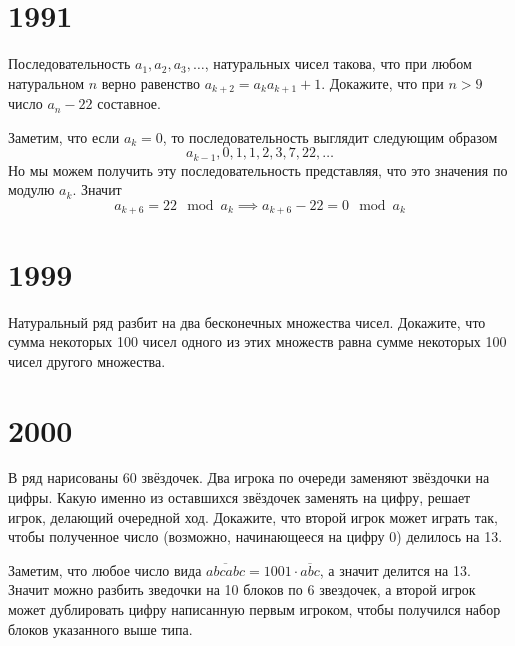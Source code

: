\documentclass[11pt, a4paper]{template}
\begin{document}
\chapter{1991}

\begin{exercise}[M1275]
Последовательность $a_{1}, a_{2}, a_{3}, \dots$, натуральных чисел такова, что при любом натуральном $n$ верно равенство $a_{k+2} = a_{k} a_{k+1} + 1$. Докажите, что при $n > 9$ число $a_{n} - 22$ составное.
\end{exercise}

\begin{solution}
Заметим, что если $a_{k} = 0$, то последовательность выглядит следующим образом
$$
a_{k-1}, 0, 1, 1, 2, 3, 7, 22, \dots 
$$
Но мы можем получить эту последовательность представляя, что это значения по модулю $a_{k}$. Значит 
$$
a_{k+6} = 22 \mod a_{k} \implies a_{k+6} - 22 = 0 \mod a_{k}
$$
\end{solution}

\begin{exercise}

\end{exercise}

\chapter{1999}

\begin{exercise}[M1667]
Натуральный ряд разбит на два бесконечных множества чисел. Докажите, что сумма некоторых 100 чисел одного из этих множеств равна сумме некоторых 100 чисел другого множества.
\end{exercise}

\chapter{2000}

\begin{exercise}[M1731]
В ряд нарисованы 60 звёздочек. Два игрока по очереди заменяют звёздочки на цифры. Какую именно из оставшихся звёздочек заменять на цифру, решает игрок, делающий очередной ход. Докажите, что второй игрок может играть так, чтобы полученное число (возможно, начинающееся на цифру 0) делилось на 13.
\end{exercise}

\begin{solution}
Заметим, что любое число вида $\overline{abcabc} = 1001 \cdot \overline{abc}$, а значит делится на 13. Значит можно разбить зведочки на 10 блоков по 6 звездочек, а второй игрок может дублировать цифру написанную первым игроком, чтобы получился набор блоков указанного выше типа. 
\end{solution}
\end{document}

